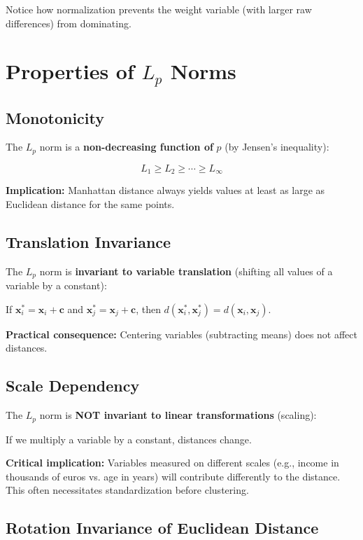 \documentclass[11pt]{article}
\begin{document}
Notice how normalization prevents the weight variable (with larger raw differences) from dominating.

\section{Properties of $L_p$ Norms}

\subsection{Monotonicity}

The $L_p$ norm is a \textbf{non-decreasing function of} $p$ (by Jensen's inequality):

$$L_1 \geq L_2 \geq \cdots \geq L_\infty$$

\textbf{Implication:} Manhattan distance always yields values at least as large as Euclidean distance for the same points.

\subsection{Translation Invariance}

The $L_p$ norm is \textbf{invariant to variable translation} (shifting all values of a variable by a constant):

If $\mathbf{x}_i^* = \mathbf{x}_i + \mathbf{c}$ and $\mathbf{x}_j^* = \mathbf{x}_j + \mathbf{c}$, then $d(\mathbf{x}_i^*, \mathbf{x}_j^*) = d(\mathbf{x}_i, \mathbf{x}_j)$.

\textbf{Practical consequence:} Centering variables (subtracting means) does not affect distances.

\subsection{Scale Dependency}

The $L_p$ norm is \textbf{NOT invariant to linear transformations} (scaling):

If we multiply a variable by a constant, distances change.

\textbf{Critical implication:} Variables measured on different scales (e.g., income in thousands of euros vs. age in years) will contribute differently to the distance. This often necessitates standardization before clustering.

\subsection{Rotation Invariance of Euclidean Distance}
\end{document}
